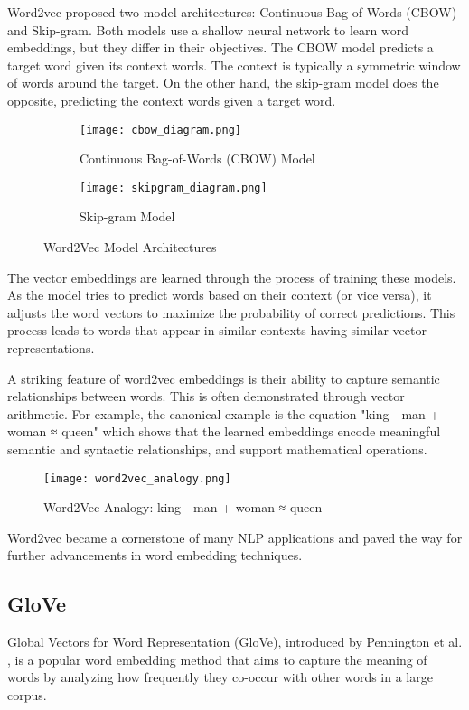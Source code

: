 \documentclass[a4paper, oneside]{discothesis}
\begin{document}
Word2vec proposed two model architectures: Continuous Bag-of-Words (CBOW) and Skip-gram. Both models use a shallow neural network to learn word embeddings, but they differ in their objectives. 
The CBOW model predicts a target word given its context words. The context is typically a symmetric window of words around the target.
On the other hand, the skip-gram model does the opposite, predicting the context words given a target word.
\begin{figure}[h]
    \centering
    \begin{subfigure}[b]{0.45\textwidth}
        \centering
        \texttt{[image: cbow\_diagram.png]}
        \caption{Continuous Bag-of-Words (CBOW) Model}
        \label{fig:cbow}
    \end{subfigure}
    \hfill
    \begin{subfigure}[b]{0.45\textwidth}
        \centering
        \texttt{[image: skipgram\_diagram.png]}
        \caption{Skip-gram Model}
        \label{fig:skipgram}
    \end{subfigure}
    \caption{Word2Vec Model Architectures}
    \label{fig:word2vec}
\end{figure}

The vector embeddings are learned through the process of training these models. As the model tries to predict words based on their context (or vice versa), it adjusts the word vectors to maximize the probability of correct predictions. This process leads to words that appear in similar contexts having similar vector representations.

A striking feature of word2vec embeddings is their ability to capture semantic relationships between words. This is often demonstrated through vector arithmetic. For example, the canonical example is the equation "king - man + woman ≈ queen" which shows that the learned embeddings encode meaningful semantic and syntactic relationships, and support mathematical operations.

\begin{figure}[h]
    \centering
    \texttt{[image: word2vec\_analogy.png]}
    \caption{Word2Vec Analogy: king - man + woman ≈ queen}
    \label{fig:word2vec_analogy}
\end{figure}

Word2vec became a cornerstone of many NLP applications and paved the way for further advancements in word embedding techniques.

\subsection{GloVe}
Global Vectors for Word Representation (GloVe), introduced by Pennington et al. \cite{pennington2014glove}, is a popular word embedding method that aims to capture the meaning of words by analyzing how frequently they co-occur with other words in a large corpus.
\end{document}
